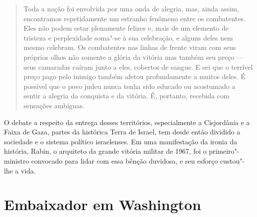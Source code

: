 \begin{quote}
Toda a nação foi envolvida por uma onda de alegria, mas, ainda assim,
encontramos repetidamente um estranho fenômeno entre os combatentes.
Eles não podem estar plenamente felizes e, mais de um elemento de
tristeza e perplexidade soma"-se à sua celebração, e alguns deles nem mesmo
celebram. Os combatentes nas linhas de frente viram com seus próprios
olhos não somente a glória da vitória mas também seu preço --- seus
camaradas caíram junto a eles, cobertos de sangue. E sei que o terrível
preço pago pelo inimigo também afetou profundamente a muitos deles. É
possível que o povo judeu nunca tenha sido educado ou acostumado a
sentir a alegria da conquista e da vitória. É, portanto, recebida com
sensações ambíguas.
\end{quote}


O debate a respeito da entrega desses territórios, especialmente a
Cisjordânia e a Faixa de Gaza, partes da histórica Terra de Israel, tem
desde então dividido a sociedade e o sistema político israelenses. Em
uma manifestação da ironia da história, Rabin, o arquiteto da grande
vitória militar de 1967, foi o primeiro"-ministro convocado para lidar com
essa bênção duvidosa, e seu esforço custou"-lhe a vida.

\chapter*{Embaixador em Washington\smallskip{}}

